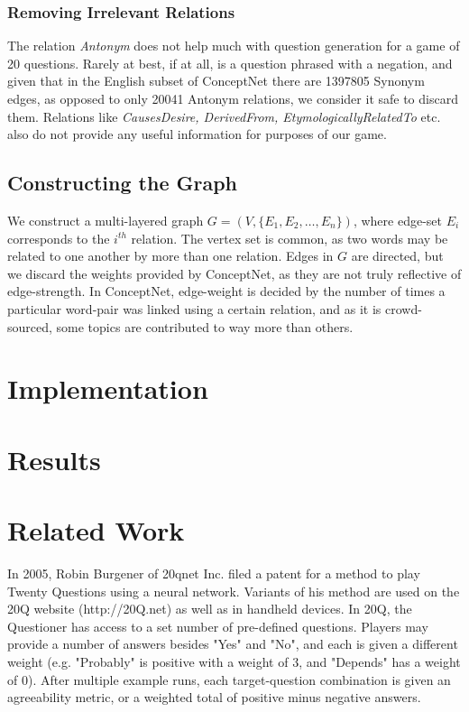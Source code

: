 \documentclass[letterpaper]{article} %
\begin{document}
\subsubsection{Removing Irrelevant Relations}
The relation \textit{Antonym} does not help much with question generation for a game of 20 questions. Rarely at best, if at all, is a question phrased with a negation, and given that in the English subset of ConceptNet there are 1397805 Synonym edges, as opposed to only 20041 Antonym relations, we consider it safe to discard them. Relations like \textit{CausesDesire, DerivedFrom, EtymologicallyRelatedTo} etc. also do not provide any useful information for purposes of our game.

\subsection{Constructing the Graph}
We construct a multi-layered graph $G=(V,\{E_1, E_2, \dots, E_n\})$, where edge-set $E_i$ corresponds to the $i^{th}$ relation. The vertex set is common, as two words may be related to one another by more than one relation. Edges in $G$ are directed, but we discard the weights provided by ConceptNet, as they are not truly reflective of edge-strength. In ConceptNet, edge-weight is decided by the number of times a particular word-pair was linked using a certain relation, and as it is crowd-sourced, some topics are contributed to way more than others.

\section{Implementation}

\section{Results}

\section{Related Work}
In 2005, Robin Burgener of 20qnet Inc. filed a patent for a method to play Twenty Questions using a neural network. Variants of his method are used on the 20Q website (http://20Q.net) as well as in handheld devices. In 20Q, the Questioner has access to a set number of pre-defined questions. Players may provide a number of answers besides "Yes" and "No", and each is given a different weight (e.g. "Probably" is positive with a weight of 3, and "Depends" has a weight of 0). After multiple example runs, each target-question combination is given an agreeability metric, or a weighted total of positive minus negative answers. \\
\end{document}
